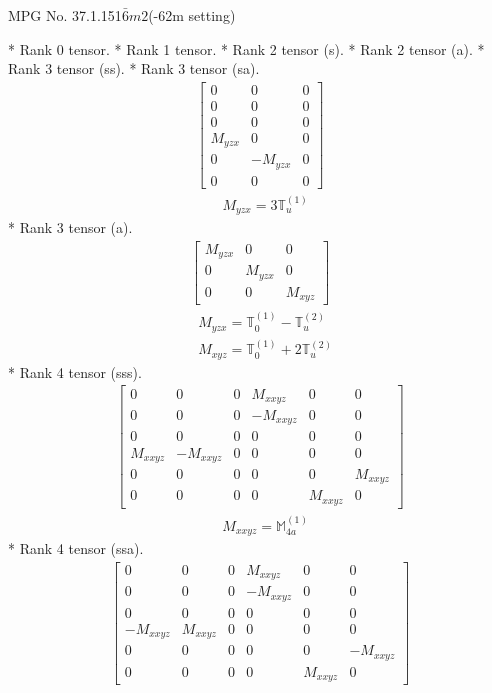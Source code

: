 \documentclass[fleqn,8pt,landscape]{jsarticle}
\begin{document}
\setcounter{MaxMatrixCols}{32}

\renewcommand{\tablename}{Table~}
\renewcommand{\figurename}{Figure~}
\begin{center}
\LARGE
MPG No. 37.1.151\quad$\bar{6}m2$\quad(-62m setting)
\end{center}
* Rank 0 tensor.
* Rank 1 tensor.
* Rank 2 tensor (s).
* Rank 2 tensor (a).
* Rank 3 tensor (ss).
* Rank 3 tensor (sa).
\begin{align*}
\begin{bmatrix} 0 & 0 & 0 \\ 0 & 0 & 0 \\ 0 & 0 & 0 \\ M_{yzx} & 0 & 0 \\ 0 & - M_{yzx} & 0 \\ 0 & 0 & 0 \end{bmatrix}
\end{align*}
\begin{align*}
& M_{yzx} = 3 \mathbb{T}_{u}^{(1)}
\end{align*}
* Rank 3 tensor (a).
\begin{align*}
\begin{bmatrix} M_{yzx} & 0 & 0 \\ 0 & M_{yzx} & 0 \\ 0 & 0 & M_{xyz} \end{bmatrix}
\end{align*}
\begin{align*}
& M_{yzx} = \mathbb{T}_{0}^{(1)} - \mathbb{T}_{u}^{(2)} \\
& M_{xyz} = \mathbb{T}_{0}^{(1)} + 2 \mathbb{T}_{u}^{(2)}
\end{align*}
* Rank 4 tensor (sss).
\begin{align*}
\begin{bmatrix} 0 & 0 & 0 & M_{xxyz} & 0 & 0 \\ 0 & 0 & 0 & - M_{xxyz} & 0 & 0 \\ 0 & 0 & 0 & 0 & 0 & 0 \\ M_{xxyz} & - M_{xxyz} & 0 & 0 & 0 & 0 \\ 0 & 0 & 0 & 0 & 0 & M_{xxyz} \\ 0 & 0 & 0 & 0 & M_{xxyz} & 0 \end{bmatrix}
\end{align*}
\begin{align*}
& M_{xxyz} = \mathbb{M}_{4a}^{(1)}
\end{align*}
* Rank 4 tensor (ssa).
\begin{align*}
\begin{bmatrix} 0 & 0 & 0 & M_{xxyz} & 0 & 0 \\ 0 & 0 & 0 & - M_{xxyz} & 0 & 0 \\ 0 & 0 & 0 & 0 & 0 & 0 \\ - M_{xxyz} & M_{xxyz} & 0 & 0 & 0 & 0 \\ 0 & 0 & 0 & 0 & 0 & - M_{xxyz} \\ 0 & 0 & 0 & 0 & M_{xxyz} & 0 \end{bmatrix}
\end{align*}
\end{document}
